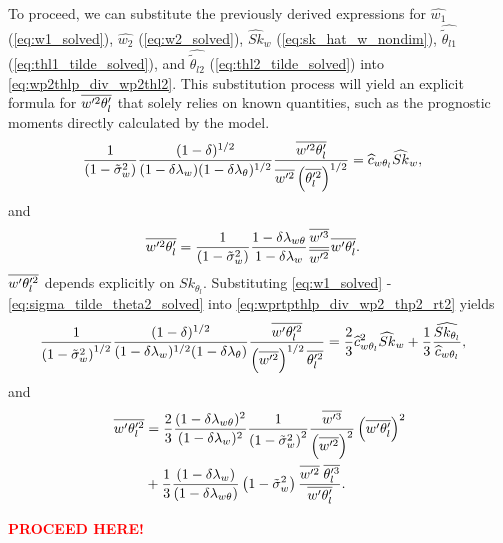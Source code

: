 To proceed, we can substitute the previously derived expressions for
$\widehat{w_1}$ (\cref{eq:w1_solved}), $\widehat{w_2}$ (\cref{eq:w2_solved}),
$\widehat{Sk}_w$ (\cref{eq:sk_hat_w_nondim}),
$\widehat{\tilde{\theta}_{l1}}$ (\cref{eq:thl1_tilde_solved}),
and $\widehat{\tilde{\theta}_{l2}}$ (\cref{eq:thl2_tilde_solved}) into \cref{eq:wp2thlp_div_wp2thl2}.
This substitution process will yield an explicit formula for $\overline{w'^2 \theta_l'}$ that solely relies on known quantities,
such as the prognostic moments directly calculated by the model.
\begin{align}
    \label{eq:wp2thlp_sk_w_solved}
    \frac{1}{\left( 1 - \tilde{\sigma}_w^2 \right)} \frac{(1-\delta)^{1/2}}{(1-\delta \lambda_w) (1-\delta \lambda_\theta)^{1/2}} \frac{\overline{w'^2\theta_l'}}{\overline{w'^2} \left(\overline{\theta_l'^2} \right)^{1/2}}
    &= \widehat{c}_{w\theta_l} \widehat{Sk}_w,
\end{align}
and
\begin{align}
    \label{eq:wp2thlp_solved}
    \overline{w'^2\theta_l'}
    &= \frac{1}{\left( 1 - \tilde{\sigma}_w^2 \right)} \frac{1 - \delta \lambda_{w\theta}}{1-\delta \lambda_w} \frac{\overline{w'^3}}{\overline{w'^2}} \overline{w'\theta_l'}.
\end{align}
$\overline{w' \theta_l'^2}$ depends explicitly on $Sk_{\theta_l}$.
Substituting \cref{eq:w1_solved} - \cref{eq:sigma_tilde_theta2_solved}
into \cref{eq:wprtpthlp_div_wp2_thp2_rt2} yields
\begin{align}
    \label{eq:wpthlp2_sk_w_solved}
    \frac{1}{\left( 1 - \tilde{\sigma}_w^2 \right)^{1/2}} \frac{(1-\delta)^{1/2}}{(1-\delta \lambda_w)^{1/2} (1-\delta \lambda_\theta)} \frac{\overline{w'\theta_l'^2}}{\left(\overline{w'^2}\right)^{1/2} \overline{\theta_l'^2}}
    &= \frac{2}{3} \widehat{c}_{w\theta_l}^2 \widehat{Sk}_w + \frac{1}{3} \frac{ \widehat{Sk_{\theta_l}} } {\widehat{c}_{w\theta_l}},
\end{align}
and
\begin{align}
    \label{eq:wpthlp2_solved}
    \overline{w'\theta_l'^2}
    &= \frac{2}{3} \frac{(1-\delta \lambda_{w \theta})^2}{(1-\delta \lambda_w)^2} \frac{1}{\left( 1 - \tilde{\sigma}_w^2 \right)^2} \frac{\overline{w'^3}}{\left(\overline{w'^2} \right)^2} \left(\overline{w'\theta_l'} \right)^2 \nonumber\\
    &+ \frac{1}{3} \frac{(1-\delta \lambda_w)}{(1-\delta \lambda_{w \theta})} \left( 1 - \tilde{\sigma}_w^2 \right) \frac{\overline{w'^2} \; \overline{\theta_l'^3} }{\overline{w'\theta_l'}}.
\end{align}

\textbf{\textcolor{red}{PROCEED HERE!}}


